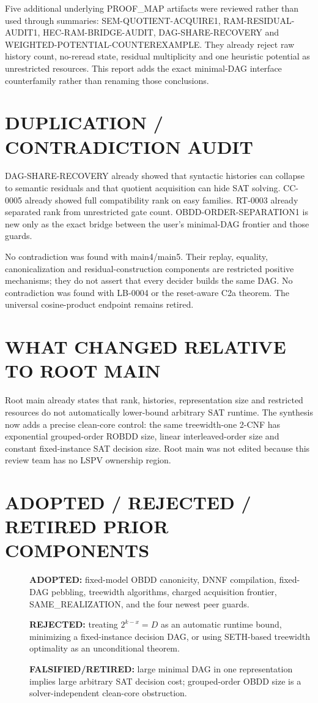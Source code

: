 \documentclass[11pt]{article}
\begin{document}
Five additional underlying PROOF\_MAP artifacts were reviewed rather than
used through summaries: SEM-QUOTIENT-ACQUIRE1, RAM-RESIDUAL-AUDIT1,
HEC-RAM-BRIDGE-AUDIT, DAG-SHARE-RECOVERY and
WEIGHTED-POTENTIAL-COUNTEREXAMPLE.  They already reject raw history count,
no-reread state, residual multiplicity and one heuristic potential as
unrestricted resources.  This report adds the exact minimal-DAG interface
counterfamily rather than renaming those conclusions.

\section{DUPLICATION / CONTRADICTION AUDIT}
DAG-SHARE-RECOVERY already showed that syntactic histories can collapse to
semantic residuals and that quotient acquisition can hide SAT solving.
CC-0005 already showed full compatibility rank on easy families.  RT-0003
already separated rank from unrestricted gate count.  OBDD-ORDER-SEPARATION1
is new only as the exact bridge between the user's minimal-DAG frontier and
those guards.

No contradiction was found with main4/main5.  Their replay, equality,
canonicalization and residual-construction components are restricted
positive mechanisms; they do not assert that every decider builds the same
DAG.  No contradiction was found with LB-0004 or the reset-aware C2a theorem.
The universal cosine-product endpoint remains retired.

\section{WHAT CHANGED RELATIVE TO ROOT MAIN}
Root main already states that rank, histories, representation size and
restricted resources do not automatically lower-bound arbitrary SAT
runtime.  The synthesis now adds a precise clean-core control: the same
treewidth-one 2-CNF has exponential grouped-order ROBDD size, linear
interleaved-order size and constant fixed-instance SAT decision size.  Root
main was not edited because this review team has no LSPV ownership region.

\section{ADOPTED / REJECTED / RETIRED PRIOR COMPONENTS}
\begin{description}
\item[] \textbf{ADOPTED:} fixed-model OBDD canonicity, DNNF compilation,
fixed-DAG pebbling, treewidth algorithms, charged acquisition frontier,
SAME\_REALIZATION, and the four newest peer guards.
\item[] \textbf{REJECTED:} treating $2^{k-x}=D$ as an automatic runtime
bound, minimizing a fixed-instance decision DAG, or using SETH-based
treewidth optimality as an unconditional theorem.
\item[] \textbf{FALSIFIED/RETIRED:} large minimal DAG in one representation
implies large arbitrary SAT decision cost; grouped-order OBDD size is a
solver-independent clean-core obstruction.
\end{description}
\end{document}
